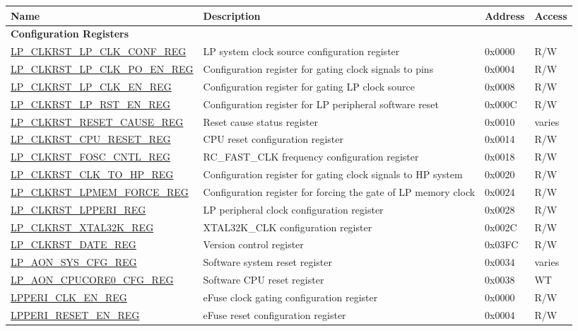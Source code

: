 \begin{longtable}{ | p{6cm} | p{7.2cm} | p{1.3cm} | p{1cm} | }
\hline\rowcolor{lightgray}
\textbf{Name} & \textbf{Description} &  \textbf{Address} & \textbf{Access} \\ \hline
\endhead
\multicolumn{4}{|l|}{\textbf{Configuration Registers}} \\ \hline
\hyperref[regdesc:LPCLKRSTLPCLKCONFREG]{LP\_CLKRST\_LP\_CLK\_CONF\_REG} & LP system clock source configuration register & 0x0000 & R/W \\ \hline
\hyperref[regdesc:LPCLKRSTLPCLKPOENREG]{LP\_CLKRST\_LP\_CLK\_PO\_EN\_REG} & Configuration register for gating clock signals to pins & 0x0004 & R/W \\ \hline
\hyperref[regdesc:LPCLKRSTLPCLKENREG]{LP\_CLKRST\_LP\_CLK\_EN\_REG} & Configuration register for gating LP clock source & 0x0008 & R/W \\ \hline
\hyperref[regdesc:LPCLKRSTLPRSTENREG]{LP\_CLKRST\_LP\_RST\_EN\_REG} & Configuration register for LP peripheral software reset & 0x000C & R/W \\ \hline
\hyperref[regdesc:LPCLKRSTRESETCAUSEREG]{LP\_CLKRST\_RESET\_CAUSE\_REG} & Reset cause status register & 0x0010 & varies \\ \hline
\hyperref[regdesc:LPCLKRSTCPURESETREG]{LP\_CLKRST\_CPU\_RESET\_REG} & CPU reset configuration register & 0x0014 & R/W \\ \hline
\hyperref[regdesc:LPCLKRSTFOSCCNTLREG]{LP\_CLKRST\_FOSC\_CNTL\_REG} & RC\_FAST\_CLK frequency configuration register & 0x0018 & R/W \\ \hline
\hyperref[regdesc:LPCLKRSTCLKTOHPREG]{LP\_CLKRST\_CLK\_TO\_HP\_REG} &  Configuration register for gating clock signals to HP system & 0x0020 & R/W \\ \hline
\hyperref[regdesc:LPCLKRSTLPMEMFORCEREG]{LP\_CLKRST\_LPMEM\_FORCE\_REG} & Configuration register for forcing the gate of LP memory clock & 0x0024 & R/W \\ \hline
\hyperref[regdesc:LPCLKRSTLPPERIREG]{LP\_CLKRST\_LPPERI\_REG} & LP peripheral clock configuration register & 0x0028 & R/W \\ \hline
\hyperref[regdesc:LPCLKRSTXTAL32KREG]{LP\_CLKRST\_XTAL32K\_REG} & XTAL32K\_CLK configuration register & 0x002C & R/W \\ \hline
\hyperref[regdesc:LPCLKRSTDATEREG]{LP\_CLKRST\_DATE\_REG} & Version control register & 0x03FC & R/W \\ \hline
\hyperref[regdesc:LPAONSYSCFGREG]{LP\_AON\_SYS\_CFG\_REG} & Software system reset register & 0x0034 & varies \\ \hline
\hyperref[regdesc:LPAONCPUCORE0CFGREG]{LP\_AON\_CPUCORE0\_CFG\_REG} & Software CPU reset register & 0x0038 & WT \\ \hline
\hyperref[regdesc:LPPERICLKENREG]{LPPERI\_CLK\_EN\_REG} & eFuse clock gating configuration register & 0x0000 & R/W \\ \hline
\hyperref[regdesc:LPPERIRESETENREG]{LPPERI\_RESET\_EN\_REG} & eFuse reset configuration register & 0x0004 & R/W \\ \hline
\end{longtable}
